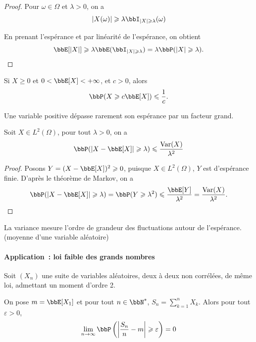 \begin{proof}
    Pour $\omega \in \Omega$ et $\lambda > 0$, on a
    \[ \lrvert{X(\omega)} \geqslant \lambda \bbI_{\lrvert{X} \geqslant \lambda}(\omega) \]

    En prenant l'espérance et par linéarité de l'espérance, on obtient
    \[ \bbE[\lrvert{X}] \geqslant \lambda \bbE(\bbI_{\lrvert{X} \geqslant \lambda})
        = \lambda \bbP(\lrvert{X} \geqslant \lambda). \qedhere \]
\end{proof}

\begin{rqq}[Interprétation]
    Si $X \geqslant 0$ et $0 < \bbE[X] < +\infty$, et $c > 0$, alors
    \[ \bbP(X \geqslant c \bbE[X]) \leqslant \frac{1}{c}. \]
\end{rqq}

Une variable positive dépasse rarement son espérance par un facteur grand.

\begin{cor}
    Soit $X \in L^2(\Omega)$, pour tout $\lambda > 0$, on a
    \[ \bbP(\lrvert{X - \bbE[X]} \geqslant \lambda) \leqslant \frac{\var(X)}{\lambda^2} \]
\end{cor}

\begin{proof}
    Posons $Y = (X - \bbE[X])^2 \geqslant 0$, puisque $X \in L^2(\Omega)$, $Y$ est d'espérance finie.
    D'après le théorème de Markov, on a
    \[ \bbP(\lrvert{X - \bbE[X]} \geqslant \lambda) = \bbP(Y \geqslant \lambda^2)
        \leqslant \frac{\bbE[Y]}{\lambda^2} = \frac{\var(X)}{\lambda^2}. \]
\end{proof}

\begin{rqq}[Interprétation]
    La variance mesure l'ordre de grandeur des fluctuations autour de l'espérance.
    (moyenne d'une variable aléatoire)
\end{rqq}

\paragraph{Application~: loi faible des grands nombres}

\begin{thm}
    Soit $(X_n)$ une suite de variables aléatoires, deux à deux non corrélées,
    de même loi, admettant un moment d'ordre 2.

    On pose $m = \bbE[X_1]$ et pour tout $n \in \bbN^*$, $S_n = \sum\limits_{k = 1}^n X_k$.
    Alors pour tout $\varepsilon > 0$,
    \[ \lim_{n \to \infty} \bbP \left(\lrvert{\frac{S_n}{n} - m} \geqslant \varepsilon\right) = 0\]
\end{thm}

